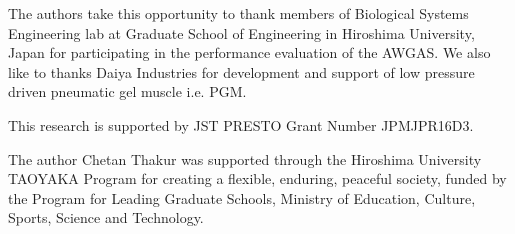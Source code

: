 \documentclass[paper,JRM,paper]{jaciiiarticle}
\begin{document}
\acknowledgements
The authors take this opportunity to thank members of Biological Systems Engineering lab at Graduate School of Engineering in Hiroshima University, Japan for participating in the performance evaluation of the AWGAS. We also like to thanks Daiya Industries for development and support of low pressure driven pneumatic gel muscle i.e. PGM.

This research is supported by JST PRESTO Grant Number JPMJPR16D3.

The author Chetan Thakur was supported through the Hiroshima University
TAOYAKA Program for creating a flexible, enduring, peaceful society, funded by the Program for Leading
Graduate Schools, Ministry of Education, Culture, Sports, Science and Technology.  


%

\end{document}
